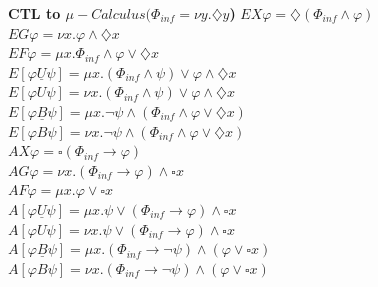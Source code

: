 \documentclass{article}
\begin{document}
\begin{multicols}{4}
\textbf{CTL to $\mu -Calculus (\Phi _{inf} = \nu y.\diamondsuit y$)}
$EX\varphi = \diamondsuit (\Phi_{inf} \wedge \varphi)$ \\
$EG\varphi = \nu x.\varphi \wedge \diamondsuit x $ \\
$EF\varphi = \mu x.\Phi_{inf} \wedge \varphi \vee \diamondsuit x  $ \\
$E[ \varphi \underline{U} \psi] = \mu x.(\Phi_{inf} \wedge \psi) \vee \varphi \wedge \diamondsuit x $ \\
$E[ \varphi U \psi] = \nu x.(\Phi_{inf} \wedge \psi) \vee \varphi \wedge \diamondsuit x $ \\
$E[ \varphi \underline{B} \psi] = \mu x.\neg\psi \wedge (\Phi_{inf} \wedge \varphi \vee \diamondsuit x) $ \\
$E[ \varphi B \psi] = \nu x.\neg\psi \wedge (\Phi_{inf} \wedge \varphi \vee \diamondsuit x) $ \\
$AX\varphi = \square (\Phi_{inf} \rightarrow \varphi)$ \\
$AG\varphi = \nu x.(\Phi_{inf} \rightarrow \varphi) \wedge \square x $ \\
$AF\varphi = \mu x.\varphi \vee \square x  $ \\
$A[ \varphi \underline{U} \psi] = \mu x. \psi \vee (\Phi_{inf} \rightarrow \varphi) \wedge \square x $ \\
$A[ \varphi U \psi] = \nu x.\psi \vee (\Phi_{inf} \rightarrow \varphi) \wedge \square x $ \\
$A[ \varphi \underline{B} \psi] = \mu x.(\Phi_{inf} \rightarrow \neg\psi) \wedge (\varphi \vee \square x) $ \\
$A[ \varphi B \psi] = \nu x.(\Phi_{inf} \rightarrow \neg\psi) \wedge (\varphi \vee \square x)$\\


\end{multicols}
\end{document}
